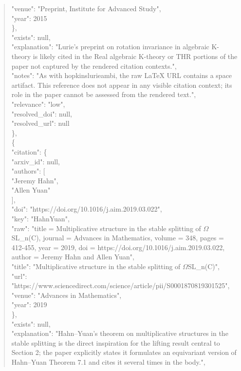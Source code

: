 \documentclass[11pt]{article}
\begin{document}
\begin{quote}
        "venue": "Preprint, Institute for Advanced Study",\\
        "year": 2015\\
      \},\\
      "exists": null,\\
      "explanation": "Lurie's preprint on rotation invariance in algebraic K-theory is likely cited in the Real algebraic K-theory or THR portions of the paper not captured by the rendered citation contexts.",\\
      "notes": "As with hopkinslurieambi, the raw LaTeX URL contains a space artifact. This reference does not appear in any visible citation context; its role in the paper cannot be assessed from the rendered text.",\\
      "relevance": "low",\\
      "resolved\_doi": null,\\
      "resolved\_url": null\\
    \},\\
    \{\\
      "citation": \{\\
        "arxiv\_id": null,\\
        "authors": [\\
          "Jeremy Hahn",\\
          "Allen Yuan"\\
        ],\\
        "doi": "https://doi.org/10.1016/j.aim.2019.03.022",\\
        "key": "HahnYuan",\\
        "raw": "title = Multiplicative structure in the stable splitting of \ensuremath{\Omega}SL\_n(C), journal = Advances in Mathematics, volume = 348, pages = 412-455, year = 2019, doi = https://doi.org/10.1016/j.aim.2019.03.022, author = Jeremy Hahn and Allen Yuan",\\
        "title": "Multiplicative structure in the stable splitting of \ensuremath{\Omega}SL\_n(C)",\\
        "url": "https://www.sciencedirect.com/science/article/pii/S0001870819301525",\\
        "venue": "Advances in Mathematics",\\
        "year": 2019\\
      \},\\
      "exists": null,\\
      "explanation": "Hahn--Yuan's theorem on multiplicative structures in the stable splitting is the direct inspiration for the lifting result central to Section 2; the paper explicitly states it formulates an equivariant version of Hahn--Yuan Theorem 7.1 and cites it several times in the body.",\\

\end{quote}
\end{document}
